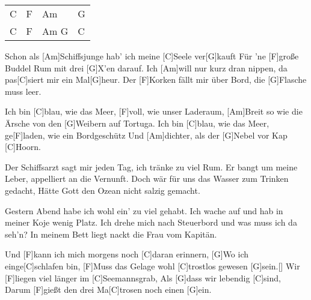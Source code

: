 

\begin{guitar}
	{\footnotesize\begin{tabular}{l|l|l|l}
			C & F & Am & G \\
			C & F & Am G & C 
	\end{tabular}}
	
	
	Schon als [Am]Schiffsjunge hab' ich meine [C]Seele ver[G]kauft
	Für 'ne [F]große Buddel Rum mit drei [G]X'en darauf.
	Ich [Am]will nur kurz dran nippen, da pas[C]siert mir ein Mal[G]heur.
	Der [F]Korken fällt mir über Bord, die [G]Flasche muss leer.
	
	Ich bin [C]blau, wie das Meer, [F]voll, wie unser Laderaum,
	[Am]Breit so wie die Ärsche von den [G]Weibern auf Tortuga.
	Ich bin [C]blau, wie das Meer, ge[F]laden, wie ein Bordgeschütz
	Und [Am]dichter, als der [G]Nebel vor Kap [C]Hoorn.
	
	Der Schiffsarzt sagt mir jeden Tag, ich tränke zu viel Rum.
	Er bangt um meine Leber, appelliert an die Vernunft.
	Doch wär für uns das Wasser zum Trinken gedacht,
	Hätte Gott den Ozean nicht salzig gemacht.
	
	 
	
	Gestern Abend habe ich wohl ein' zu viel gehabt.
	Ich wache auf und hab in meiner Koje wenig Platz.
	Ich drehe mich nach Steuerbord und was muss ich da seh'n?
	In meinem Bett liegt nackt die Frau vom Kapitän.
	
	 
	
	\pagebreak
	
	Und [F]kann ich mich morgens noch [C]daran erinnern,
	[G]Wo ich einge[C]schlafen bin,
	[F]Muss das Gelage wohl [C]trostlos gewesen [G]sein.[]{}
	Wir [F]liegen viel länger im [C]Seemannsgrab,
	Als [G]dass wir lebendig [C]sind,
	Darum [F]gießt den drei Ma[C]trosen noch einen [G]ein.
	
	 
	
	 
	
\end{guitar}